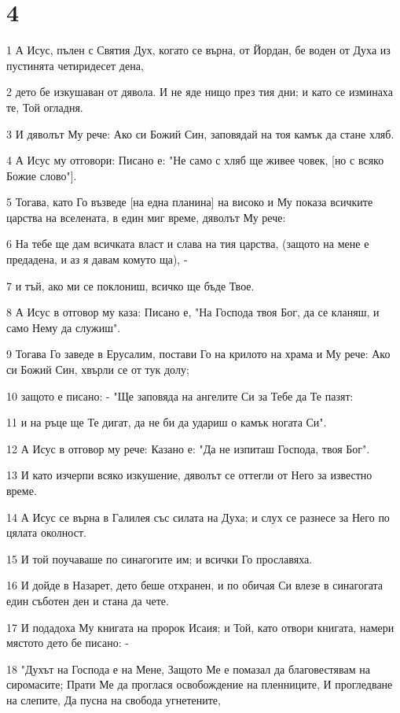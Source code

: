 \chapter{4}

\par 1 А Исус, пълен с Святия Дух, когато се върна, от Йордан, бе воден от Духа из пустинята четиридесет дена,
\par 2 дето бе изкушаван от дявола. И не яде нищо през тия дни; и като се изминаха те, Той огладня.
\par 3 И дяволът Му рече: Ако си Божий Син, заповядай на тоя камък да стане хляб.
\par 4 А Исус му отговори: Писано е: "Не само с хляб ще живее човек, [но с всяко Божие слово"].
\par 5 Тогава, като Го възведе [на една планина] на високо и Му показа всичките царства на вселената, в един миг време, дяволът Му рече:
\par 6 На тебе ще дам всичката власт и слава на тия царства, (защото на мене е предадена, и аз я давам комуто ща), -
\par 7 и тъй, ако ми се поклониш, всичко ще бъде Твое.
\par 8 А Исус в отговор му каза: Писано е, "На Господа твоя Бог, да се кланяш, и само Нему да служиш".
\par 9 Тогава Го заведе в Ерусалим, постави Го на крилото на храма и Му рече: Ако си Божий Син, хвърли се от тук долу;
\par 10 защото е писано: - "Ще заповяда на ангелите Си за Тебе да Те пазят:
\par 11 и на ръце ще Те дигат, да не би да удариш о камък ногата Си".
\par 12 А Исус в отговор му рече: Казано е: "Да не изпиташ Господа, твоя Бог".
\par 13 И като изчерпи всяко изкушение, дяволът се оттегли от Него за известно време.
\par 14 А Исус се върна в Галилея със силата на Духа; и слух се разнесе за Него по цялата околност.
\par 15 И той поучаваше по синагогите им; и всички Го прославяха.
\par 16 И дойде в Назарет, дето беше отхранен, и по обичая Си влезе в синагогата един съботен ден и стана да чете.
\par 17 И подадоха Му книгата на пророк Исаия; и Той, като отвори книгата, намери мястото дето бе писано: -
\par 18 "Духът на Господа е на Мене, Защото Ме е помазал да благовестявам на сиромасите; Прати Ме да проглася освобождение на пленниците, И прогледване на слепите, Да пусна на свобода угнетените,
